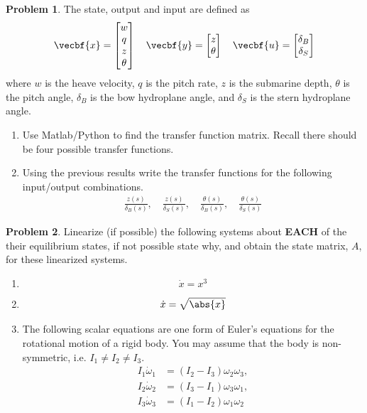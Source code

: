 \documentclass[10pt]{article}
\theoremstyle{definition}
\newtheorem{prob}{Problem}[section]
\newenvironment{subprob}%
{\renewcommand{\theenumi}{\alph{enumi}}\renewcommand{\labelenumi}{(\theenumi)}\begin{enumerate}}%
{\end{enumerate}}%
\begin{document}
\begin{prob}
    The state, output and input are defined as
    \begin{align*}
        \vecbf{x} = \begin{bmatrix}
            w \\ q \\ z \\ \theta
        \end{bmatrix}
        \quad
        \vecbf{y} = \begin{bmatrix} z \\ \theta \end{bmatrix} \quad \vecbf{u} = \begin{bmatrix} \delta_B \\ \delta_S \end{bmatrix}
    \end{align*}
    where \( w\) is the heave velocity, \( q \) is the pitch rate, \( z \) is the submarine depth, \( \theta\) is the pitch angle, \( \delta_B\) is the bow hydroplane angle, and \( \delta_S\) is the stern hydroplane angle.

    \begin{subprob}
        \item Use Matlab/Python to find the transfer function matrix. 
            Recall there should be four possible transfer functions.
        \item Using the previous results write the transfer functions for the following input/output combinations.
            \begin{align*}
                \frac{z(s)}{\delta_B(s)} ,\quad \frac{z(s)}{\delta_S(s)} ,\quad \frac{\theta(s)}{\delta_B(s)} ,\quad \frac{\theta(s)}{\delta_S(s)}
            \end{align*}
    \end{subprob}
\end{prob}

\begin{prob}
    Linearize (if possible) the following systems about \textbf{EACH} of the their equilibrium states, if not possible state why, and obtain the state matrix, \( A \), for these linearized systems.

    \begin{subprob}
        \item \[ \dot x = x^3\]
        \item \[ \dot x = \sqrt{ \abs{x}} \]
        \item The following scalar equations are one form of Euler's equations for the rotational motion of a rigid body. 
            You may assume that the body is non-symmetric, i.e. \( I_1 \neq I_2 \neq I_3\).
            \begin{align*}
                I_1 \dot \omega_1 &= (I_2 - I_3) \omega_2 \omega_3 , \\
                I_2 \dot \omega_2 &= (I_3 - I_1) \omega_3 \omega_1 , \\
                I_3 \dot \omega_3 &= (I_1 - I_2) \omega_1 \omega_2  \\
            \end{align*}
    \end{subprob}
\end{prob}
\end{document}
